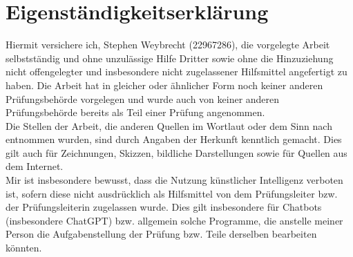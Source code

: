 \documentclass[11pt,paper=a4,twoside,headsepline,numbers=noenddot,toc=bibliography,cleardoublepage=empty,parskip=half,DIV=calc,BCOR=6mm,pagesize=pdftex]{article}
\begin{document}
\clearpage
\mbox{}
\clearpage

\renewcommand\refname{Bibliography}
\printbibliography[
heading=bibintoc,
title={Bibliography}
]
\clearpage
\mbox{}
\clearpage




\clearpage

\section*{Eigenständigkeitserklärung}
Hiermit versichere ich, Stephen Weybrecht (22967286), die vorgelegte Arbeit selbstständig und ohne unzulässige Hilfe Dritter sowie ohne die Hinzuziehung nicht offengelegter und insbesondere nicht zugelassener Hilfsmittel angefertigt zu haben. Die Arbeit hat in gleicher oder ähnlicher Form noch keiner anderen Prüfungsbehörde vorgelegen und wurde auch von keiner anderen Prüfungsbehörde bereits als Teil einer Prüfung angenommen.\\

Die Stellen der Arbeit, die anderen Quellen im Wortlaut oder dem Sinn nach entnommen wurden, sind durch Angaben der Herkunft kenntlich gemacht. Dies gilt auch für Zeichnungen, Skizzen, bildliche Darstellungen sowie für Quellen aus dem Internet.\\

Mir ist insbesondere bewusst, dass die Nutzung künstlicher Intelligenz verboten ist, sofern diese nicht ausdrücklich als Hilfsmittel von dem Prüfungsleiter bzw. der Prüfungsleiterin zugelassen wurde. Dies gilt insbesondere für Chatbots (insbesondere ChatGPT) bzw. allgemein solche Programme, die anstelle meiner Person die Aufgabenstellung der Prüfung bzw. Teile derselben bearbeiten könnten.\\

\vspace{10cm}
\begin{flushleft}
\makebox[.4\textwidth]{\hrulefill}\hfill \makebox[.4\textwidth]{\hrulefill}\\
\hfill
{}\\
\end{flushleft}
\end{document}
